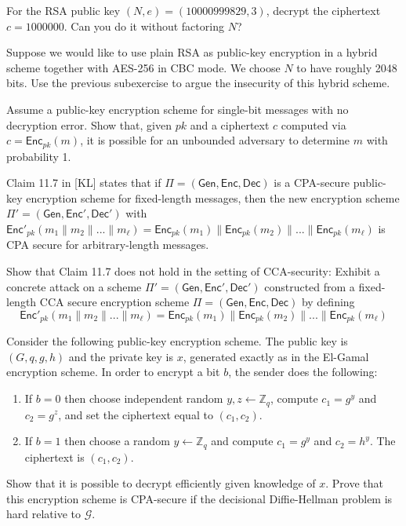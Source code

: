 \documentclass[a4paper,10pt,landscape,twocolumn]{scrartcl}
\begin{document}
\begin{exercise}
\begin{subex}
For the RSA public key $(N,e)=(10000999829, 3)$, decrypt the ciphertext $c=1 000 000$. Can you do it without factoring $N$?
\end{subex}
\begin{subex}
Suppose we would like to use plain RSA as public-key encryption in a hybrid scheme together with AES-256 in CBC mode. We choose $N$ to have roughly 2048 bits. Use the previous subexercise to argue the insecurity of this hybrid scheme.
\end{subex}
\end{exercise}


\begin{exercise}
	Assume a public-key encryption scheme for single-bit messages with no
	decryption error. Show that, given $pk$ and a ciphertext $c$ computed via
	$c=\mathsf{Enc}_{pk}(m)$, it is possible for an unbounded adversary to determine
	$m$ with probability 1.
\end{exercise}

	
\pagebreak
\begin{exercise}
Claim 11.7 in [KL] states that if $\Pi=(\mathsf{Gen},\mathsf{Enc}, \mathsf{Dec})$ is a CPA-secure public-key encryption scheme for fixed-length messages, then the new encryption scheme $\Pi'=(\mathsf{Gen},\mathsf{Enc}', \mathsf{Dec}')$ with  $\mathsf{Enc}'_{pk}(m_1\|m_2\|...\|m_\ell)=\mathsf{Enc}_{pk}(m_1)\|\mathsf{Enc}_{pk}(m_2)\|...\|\mathsf{Enc}_{pk}(m_\ell)$ is CPA secure for arbitrary-length messages.

	Show that Claim 11.7 does not hold in the setting of CCA-security: Exhibit a concrete attack on a scheme $\Pi'=(\mathsf{Gen},\mathsf{Enc}', \mathsf{Dec}')$ constructed from a fixed-length CCA secure encryption scheme $\Pi=(\mathsf{Gen},\mathsf{Enc}, \mathsf{Dec})$ by defining 
\[ \mathsf{Enc}'_{pk}(m_1\|m_2\|...\|m_\ell)=\mathsf{Enc}_{pk}(m_1)\|\mathsf{Enc}_{pk}(m_2)\|...\|\mathsf{Enc}_{pk}(m_\ell) \]
\end{exercise}




\begin{bonusexercise}
	Consider the following public-key encryption scheme. The public key is $(G,q,g,h)$ and the private key is $x$, generated exactly as in the El-Gamal encryption scheme. In order to encrypt a bit $b$, the sender does the following:
	\begin{enumerate}
		\item If $b=0$ then choose independent random $y,z \leftarrow \mathbb{Z}_q$, compute $c_1 = g^y$ and $c_2 = g^z$, and set the ciphertext equal to $(c_1, c_2)$.
		\item If $b = 1$ then choose a random $y\leftarrow \mathbb{Z}_q$ and compute $c_1 =g^y$ and $c_2 = h^y$. The ciphertext is $(c_1, c_2)$.
	\end{enumerate}
	Show that it is possible to decrypt efficiently given knowledge of $x$. Prove that this encryption scheme is CPA-secure if the decisional Diffie-Hellman problem is hard relative to $\mathcal{G}$.
\end{bonusexercise}
\end{document}
